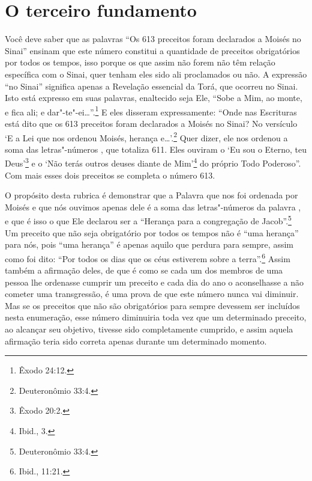 \chapter*{O terceiro fundamento}

Você deve saber que as palavras ``Os 613 preceitos foram declarados a
Moisés no Sinai'' ensinam que este número constitui a quantidade de
preceitos obrigatórios por todos os tempos, isso porque os que assim não
forem não têm relação específica com o Sinai, quer tenham eles sido ali
proclamados ou não. A expressão ``no Sinai'' significa apenas a
Revelação essencial da Torá\starr, que ocorreu no Sinai. Isto está expresso
em suas palavras, enaltecido seja Ele, ``Sobe a Mim, ao monte, e fica
ali; e dar"-te"-ei\ldots{}''.\footnote{Êxodo 24:12.} E eles disseram expressamente:
``Onde nas Escrituras está dito que os 613 preceitos foram declarados a
Moisés no Sinai? No versículo `E a Lei que nos ordenou Moisés, herança
e\ldots{}'.\footnote{Deuteronômio 33:4.} Quer dizer, ele nos ordenou a soma das
letras"-números , que totaliza 611. Eles ouviram o `Eu sou o
Eterno, teu Deus'\footnote{Êxodo 20:2.} e o `Não terás outros deuses diante de
Mim'\footnote{Ibid., 3.} do próprio Todo Poderoso''. Com mais esses dois
preceitos se completa o número 613.

O propósito desta rubrica é demonstrar que a Palavra que nos foi
ordenada por Moisés e que nós ouvimos apenas dele é a soma das
letras"-números da palavra , e que é isso o que Ele declarou ser a
``Herança para a congregação de Jacob\starr''.\footnote{Deuteronômio 33:4.} Um preceito
que não seja obrigatório por todos os tempos não é ``uma herança'' para
nós, pois ``uma herança'' é apenas aquilo que perdura para sempre,
assim como foi dito: ``Por todos os dias que os céus estiverem sobre a
terra''.\footnote{Ibid., 11:21.} Assim também a afirmação deles, de que é como
se cada um dos membros de uma pessoa lhe ordenasse cumprir um preceito
e cada dia do ano o aconselhasse a não cometer uma transgressão, é uma
prova de que este número nunca vai diminuir. Mas se os preceitos que não
são obrigatórios para sempre devessem ser incluídos nesta enumeração,
esse número diminuiria toda vez que um determinado preceito, ao alcançar
seu objetivo, tivesse sido completamente cumprido, e assim aquela
afirmação teria sido correta apenas durante um determinado momento.

